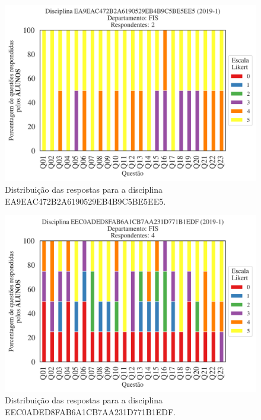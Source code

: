 \documentclass[a4paper,10pt]{article}
\begin{document}
\begin{figure}[h]
\centering
\includegraphics[width=0.485\linewidth]{analise_disciplina_departamento_FIS_ALUNO_TURMA_EA9EAC472B2A6190529EB4B9C5BE5EE5.png}
\caption{\label{fig:analise_geral_departamento}                Distribuição das respostas para a disciplina EA9EAC472B2A6190529EB4B9C5BE5EE5.}
\end{figure}
\begin{figure}[h]
\centering
\includegraphics[width=0.485\linewidth]{analise_disciplina_departamento_FIS_ALUNO_TURMA_EEC0ADED8FAB6A1CB7AA231D771B1EDF.png}
\caption{\label{fig:analise_geral_departamento}                Distribuição das respostas para a disciplina EEC0ADED8FAB6A1CB7AA231D771B1EDF.}
\end{figure}
\end{document}
